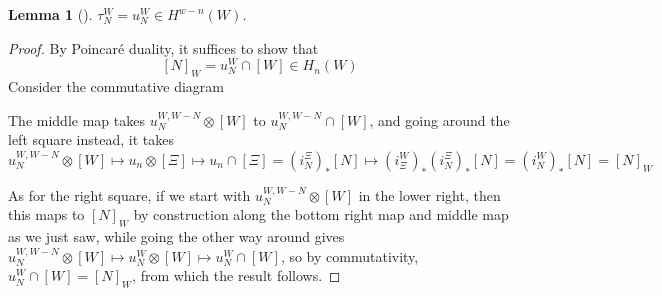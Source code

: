 \documentclass[reqno]{amsart}
\newtheorem{lemma}[theorem]{Lemma}
\theoremstyle{definition}
\theoremstyle{remark}
\begin{document}
      \begin{lemma}[]
          $\tau_{N}^{W} = u_N^{W} \in 
          H^{w-n}(W)$.
      \end{lemma}

      \begin{proof}
          By Poincaré duality, it suffices to show that
          \[
          \left[ N \right]_W = u_{N}^{W} \cap \left[ W \right] 
          \in H_n(W)
          \] 
          Consider the commutative diagram


          The middle map takes
          $u_N^{W, W-N} \otimes \left[ W \right] $ to
          $u_{N}^{W,W-N} \cap \left[ W \right] $, and 
          going around the left square instead, it takes
          $u_{N}^{W,W-N} \otimes \left[ W \right] 
          \mapsto u_n \otimes \left[ \Xi \right] \mapsto 
          u_n \cap \left[ \Xi \right] 
          = \left( i_N^{\Xi} \right)_* \left[ N \right] \mapsto 
          \left( i_{\Xi}^{W} \right)_* 
          \left( i_{N}^{\Xi} \right)_* \left[ N \right] =
          \left( i_{N}^{W} \right)_* \left[ N \right] =
          \left[ N \right]_W$


          As for the right square, 
          if we start with
          $u_N^{W,W-N} \otimes \left[ W \right] $ in the
          lower right, then this
          maps to $\left[ N \right]_W $ by
          construction along the bottom right
          map and middle map as we just saw, while going the other way around
          gives
          $u_N^{W,W-N} \otimes \left[ W \right] 
          \mapsto u_N^{W} \otimes \left[ W \right] 
          \mapsto u_N^{W} \cap \left[ W \right] $, so
          by commutativity,
          $u_N^{W} \cap \left[ W \right] = \left[ N \right]_W$, from
          which the result follows.


          


      \end{proof}
\end{document}
